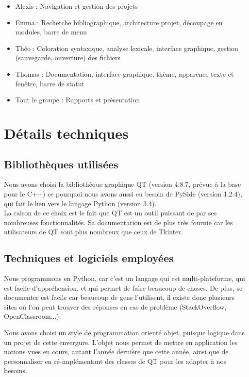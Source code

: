 \documentclass[a4paper,12pt]{article}
\begin{document}
	\begin{itemize}
		\item Alexis : Navigation et gestion des projets
		\item Emma : Recherche bibliographique, architecture projet, découpage en modules, barre de menu
		\item Théo : Coloration syntaxique, analyse lexicale, interface graphique, gestion (sauvegarde, ouverture) des fichiers
		\item Thomas : Documentation, interface graphique, thème, apparence texte et fenêtre, barre de statut
		\item Tout le groupe : Rapports et présentation 
	\end{itemize}
	
\section{Détails techniques}

	\subsection{Bibliothèques utilisées}
	
	
	Nous avons choisi la bibliothèque graphique QT (version 4.8.7, prévue à la base pour le C++) ce pourquoi nous avons aussi eu besoin de PySide (version 1.2.4), qui fait le lien vers le langage Python (version 3.4).\\
	
	La raison de ce choix est le fait que QT est un outil puissant de par ses nombreuses fonctionnalités. Sa documentation est de plus très fournie car les utilisateurs de QT sont plus nombreux que ceux de Tkinter.
	
	\subsection{Techniques et logiciels employées}
	
	Nous programmons en Python, car c'est un langage qui est multi-plateforme, qui est facile d'appréhension, et qui permet de faire beaucoup de choses. De plus, se documenter est facile car beaucoup de gens l'utilisent, il existe donc plusieurs sites où l'on peut trouver des réponses en cas de problème (StackOverflow, OpenClassroom...).
	
	Nous avons choisi un style de programmation orienté objet, puisque logique dans un projet de cette envergure. L'objet nous permet de mettre en application les notions vues en cours, autant l'année dernière que cette année, ainsi que de personnaliser en ré-implémentant des classes de QT pour les adapter à nos besoins.\\
	
\end{document}
